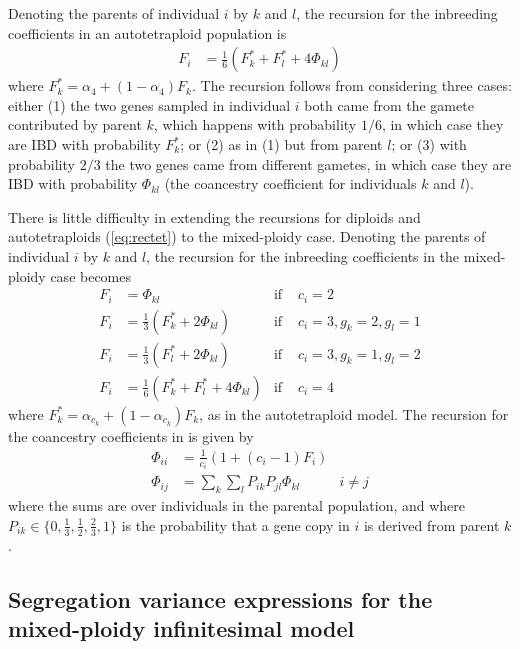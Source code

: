 \documentclass[11pt,a4paper]{article}
\begin{document}
Denoting the parents of individual $i$ by $k$ and $l$, the recursion for the
inbreeding coefficients in an autotetraploid population is
\begin{align}
    F_i &= \frac1 6 (F_k^\ast + F_l^\ast + 4\Phi_{kl}) \label{eq:rectet}
\end{align}
where $F_k^\ast = \alpha_4 + (1-\alpha_4)F_k$.
The recursion follows from considering three cases:
either (1) the two genes sampled in individual $i$ both came from the gamete
contributed by parent $k$, which happens with probability $1/6$, in which case
they are IBD with probability $F_k^\ast$; or (2) as in (1) but from parent $l$; or
(3) with probability $2/3$ the two genes came from different gametes, in which
case they are IBD with probability $\Phi_{kl}$ (the coancestry coefficient for
individuals $k$ and $l$).

There is little difficulty in extending the recursions for diploids
\citep{barton2017} and autotetraploids (\cref{eq:rectet}) to the mixed-ploidy
case. 
Denoting the parents of individual $i$ by $k$ and $l$, the recursion for the
inbreeding coefficients in the mixed-ploidy case becomes
\begin{align}
    F_i &= \Phi_{kl} & \text{if } & c_i = 2 \nonumber \\ 
    F_i &= \frac{1}{3}\left(F_k^\ast + 2\Phi_{kl}\right) & \text{if } 
        & c_i = 3, g_k = 2, g_l = 1 \nonumber \\ 
    F_i &= \frac{1}{3}\left(F_l^\ast + 2\Phi_{kl}\right) & \text{if } 
        & c_i = 3, g_k = 1, g_l = 2 \nonumber \\ 
    F_i &= \frac1 6 (F_k^\ast + F_l^\ast + 4\Phi_{kl}) & \text{if } & c_i = 4
\end{align}
where $F_k^\ast = \alpha_{c_k} + (1-\alpha_{c_k})F_k$, as in the
autotetraploid model.
The recursion for the coancestry coefficients in is given by
\begin{align}
    \Phi_{ii} &= \frac{1}{c_{i}} \left(1 + (c_i-1)F_i\right) \nonumber \\
    \Phi_{ij} &= \sum_k \sum_l P_{ik}P_{jl} \Phi_{kl} & i \ne j 
    \label{eq:coancestry}
\end{align}
where the sums are over individuals in the parental population, and where
$P_{ik} \in \{0, \frac1 3, \frac1 2, \frac2 3, 1\}$ is the probability that a
gene copy in $i$ is derived from parent $k$.


\subsection{Segregation variance expressions for the mixed-ploidy infinitesimal 
model \label{sec:segvar}}
\end{document}
